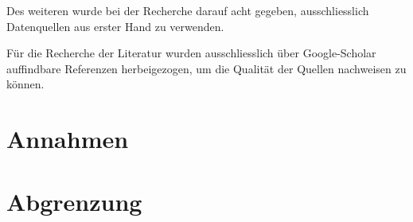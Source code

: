 Des weiteren wurde bei der Recherche darauf acht gegeben, ausschliesslich Datenquellen aus erster Hand zu verwenden. 

Für die Recherche der Literatur wurden ausschliesslich über Google-Scholar auffindbare Referenzen herbeigezogen, um die Qualität der Quellen nachweisen zu können.
 

\section{Annahmen}

\section{Abgrenzung}
